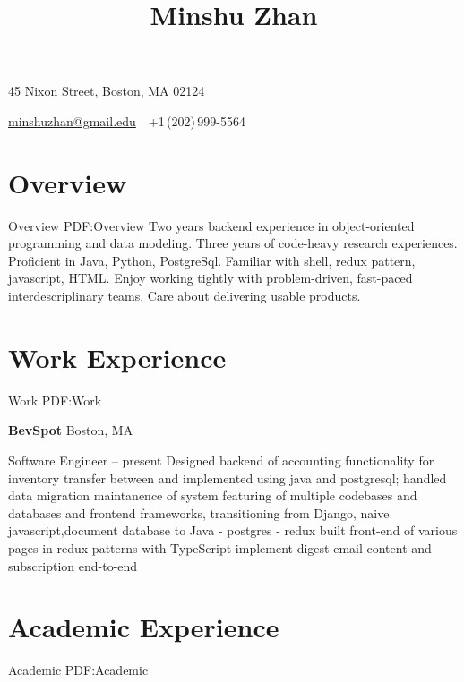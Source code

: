 \documentclass[a4paper,10pt,oneside]{article}
\begin{document}

\title{Minshu Zhan}

\begin{subtitle}
45 Nixon Street, Boston, MA 02124
\par
\href{mailto:minshuzhan@gmail.edu}
{minshuzhan@gmail.edu}
\,\BulletSymbol\,
+1\,(202)\,999-5564
\end{subtitle}

\begin{body}


\section
{Overview}
{Overview}
{PDF:Overview}
Two years backend experience in object-oriented programming and data modeling. Three years of code-heavy research experiences. 
Proficient in Java, Python, PostgreSql. Familiar with shell, redux pattern, javascript, HTML. Enjoy working tightly with problem-driven, fast-paced interdescriplinary teams. Care about delivering usable products.


\section
{Work Experience}
{Work}
{PDF:Work}

\textbf{BevSpot}
\hfill Boston, MA
\par
Software Engineer
\hfill
{} --
present
\BulletItem Designed backend of accounting functionality for inventory transfer between and implemented using java and postgresql; handled data migration
\BulletItem maintanence of system featuring of multiple codebases and databases and frontend frameworks, transitioning from Django, naive javascript,document database to Java - postgres - redux
\BulletItem built front-end of various pages in redux patterns with TypeScript
\BulletItem implement digest email content and subscription end-to-end


\section
{Academic Experience}
{Academic}
{PDF:Academic}


\end{body}
\end{document}
